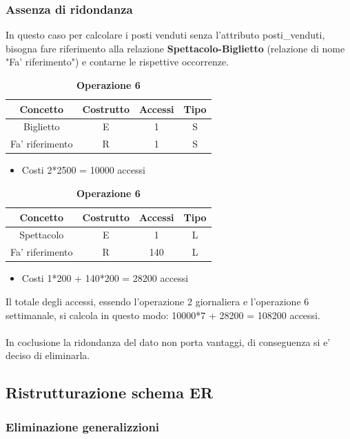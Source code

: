 \documentclass[10pt]{article}
\begin{document}
	\subsubsection{Assenza di ridondanza}
	In questo caso per calcolare i posti venduti senza l'attributo posti\_venduti, bisogna fare riferimento alla relazione \textbf{Spettacolo-Biglietto} (relazione di nome "Fa' riferimento") e contarne le rispettive occorrenze.	
	\begin{table}[h!]
		\centering
		\caption{\textbf{Operazione 2}} \label{tab:sometab}
		\begin{tabular}{|c|c|c|c|}
			\hline
			\textbf{Concetto} & \textbf{Costrutto} & \textbf{Accessi} & \textbf{Tipo} \\
			\hline
			Biglietto & E & 1 & S \\
			\hline
			Fa' riferimento & R & 1 & S \\
			\hline
		\end{tabular}
		\begin{itemize}
			\item Costi 2*2500 = 10000 accessi 
		\end{itemize}
		\caption{\textbf{Operazione 6}} \label{tab:sometab}
		\begin{tabular}{|c|c|c|c|}
			\hline
			\textbf{Concetto} & \textbf{Costrutto} & \textbf{Accessi} & \textbf{Tipo} \\
			\hline
			Spettacolo & E & 1 & L \\
			\hline
			Fa' riferimento & R &140&L\\
			\hline
		\end{tabular}
		\begin{itemize}
			\item Costi 1*200 + 140*200 = 28200 accessi
		\end{itemize}
	\end{table}
	Il totale degli accessi, essendo l'operazione 2 giornaliera e l'operazione 6 settimanale, si calcola in questo modo: 10000*7 + 28200 = 108200 accessi.\\\\
	In coclusione la ridondanza del dato non porta vantaggi, di conseguenza si e' deciso di eliminarla.
	\subsection{Ristrutturazione schema ER}
	\subsubsection{Eliminazione generalizzioni}
\end{document}
